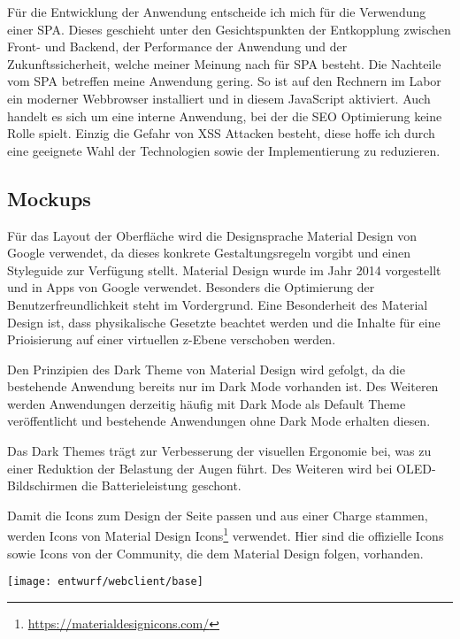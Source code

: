 Für die Entwicklung der Anwendung entscheide ich mich für die Verwendung einer SPA. Dieses geschieht unter den Gesichtspunkten der Entkopplung zwischen Front- und Backend, der Performance der Anwendung und der Zukunftssicherheit, welche meiner Meinung nach für SPA besteht. Die Nachteile vom SPA betreffen meine Anwendung gering. So ist auf den Rechnern im Labor ein moderner Webbrowser installiert und in diesem JavaScript aktiviert. Auch handelt es sich um eine interne Anwendung, bei der die SEO Optimierung keine Rolle spielt. Einzig die Gefahr von XSS Attacken besteht, diese hoffe ich durch eine geeignete Wahl der Technologien sowie der Implementierung zu reduzieren.  \cite{melnikSinglePageApplication2020}

\subsection{Mockups} \label{subsec:Mockup}

Für das Layout der Oberfläche wird die Designsprache Material Design von Google verwendet, da dieses konkrete Gestaltungsregeln vorgibt und einen Styleguide zur Verfügung stellt. Material Design wurde im Jahr 2014 vorgestellt und in Apps von Google verwendet. Besonders die Optimierung der Benutzerfreundlichkeit steht im Vordergrund. Eine Besonderheit des Material Design ist, dass physikalische Gesetzte beachtet werden und die Inhalte für eine Prioisierung auf einer virtuellen z-Ebene verschoben werden. \cite{kulturbanause-teamMaterialDesignDesignsprache2017}

Den Prinzipien des Dark Theme von Material Design wird gefolgt, da die bestehende Anwendung bereits nur im Dark Mode vorhanden ist. Des Weiteren werden Anwendungen derzeitig häufig mit Dark Mode als Default Theme veröffentlicht und bestehende Anwendungen ohne Dark Mode erhalten diesen. \cite{colbyWindows10Dark2020}

Das Dark Themes trägt zur Verbesserung der visuellen Ergonomie bei, was zu einer Reduktion der Belastung der Augen führt. Des Weiteren wird bei OLED-Bildschirmen die Batterieleistung geschont. \cite{googleDarkTheme}

Damit die Icons zum Design der Seite passen und aus einer Charge stammen, werden Icons von Material Design Icons\footnote{\url{https://materialdesignicons.com/}} verwendet. Hier sind die offizielle Icons sowie Icons von der Community, die dem Material Design folgen, vorhanden.

\begin{center}
	\texttt{[image: entwurf/webclient/base]}
	\label{fig:mockup-base}
\end{center}

